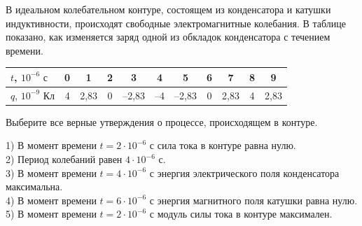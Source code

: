 \begin{taskbasic}[code={\label{task:elem_osc_v18_n14}}]
В идеальном колебательном контуре, состоящем из конденсатора и катушки индуктивности, происходят свободные электромагнитные колебания. В таблице показано, как изменяется заряд одной из обкладок конденсатора с течением времени.

\nopagebreak\smallskip
\begin{center}
\small
\begin{tabular}{|l|c|c|c|c|c|c|c|c|c|c|}
\hline
$t$, $10^{-6}\text{ с}$ & 0 & 1 & 2 & 3 & 4 & 5 & 6 & 7 & 8 & 9 \\ \hline
$q$, $10^{-9}\text{ Кл}$ & 4 & 2,83 & 0 & --2,83 & --4 & --2,83 & 0 & 2,83 & 4 & 2,83 \\ \hline
\end{tabular}
\end{center}
\smallskip

Выберите все верные утверждения о процессе, происходящем в контуре.

1) В момент времени $t = 2\cdot 10^{-6}\text{ с}$ сила тока в контуре равна нулю.\\
2) Период колебаний равен $4\cdot 10^{-6}\text{ с}$.\\
3) В момент времени $t = 4\cdot 10^{-6}\text{ с}$ энергия электрического поля конденсатора максимальна.\\
4) В момент времени $t = 6\cdot 10^{-6}\text{ с}$ энергия магнитного поля катушки равна нулю.\\
5) В момент времени $t = 2\cdot 10^{-6}\text{ с}$ модуль силы тока в контуре максимален.

\end{taskbasic}

